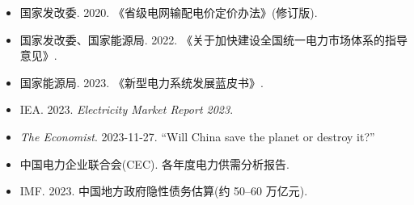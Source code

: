 \documentclass[UTF8,12pt,a4paper]{ctexrep}
\begin{document}
\begin{itemize}
  \item 国家发改委. 2020. 《省级电网输配电价定价办法》(修订版).
  \item 国家发改委、国家能源局. 2022. 《关于加快建设全国统一电力市场体系的指导意见》.
  \item 国家能源局. 2023. 《新型电力系统发展蓝皮书》.
  \item IEA. 2023. \emph{Electricity Market Report 2023}.
  \item \emph{The Economist}. 2023-11-27. ``Will China save the planet or destroy it?''
  \item 中国电力企业联合会(CEC). 各年度电力供需分析报告.
  \item IMF. 2023. 中国地方政府隐性债务估算(约 50--60 万亿元).
\end{itemize}
\end{document}
